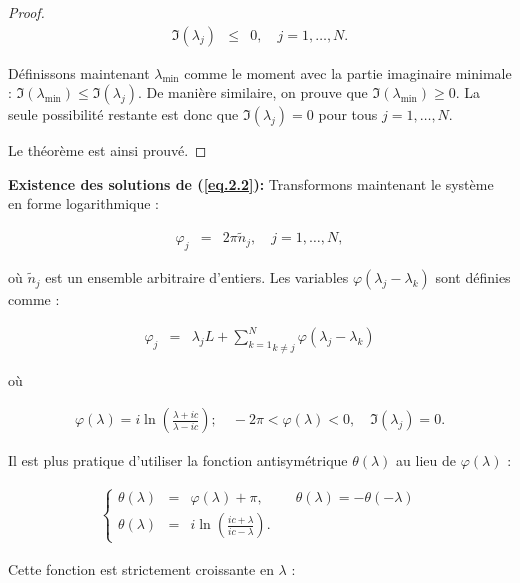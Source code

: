 \begin{proof}
	\begin{eqnarray}
		\Im(\lambda_j)  & \leq &  0, \quad j = 1, \dots, N.	
	\end{eqnarray}

	
	Définissons maintenant \( \lambda_{\text{min}} \) comme le moment avec la partie imaginaire minimale : \( \Im(\lambda_{\text{min}}) \leq \Im(\lambda_j) \). De manière similaire, on prouve que \( \Im(\lambda_{\text{min}}) \geq 0 \). La seule possibilité restante est donc que \( \Im(\lambda_j) = 0 \) pour tous \( j = 1, \dots, N \).
	
	Le théorème est ainsi prouvé.
	
\end{proof}


\textbf{Existence des solutions de (\ref{eq.2.2}):}
Transformons maintenant le système en forme logarithmique :


\begin{eqnarray}
	\varphi_j & = &	2 \pi \tilde{n}_j 	, \quad j = 1, \dots, N, \label{eq.2.8}
\end{eqnarray}


où \( \tilde{n}_j \) est un ensemble arbitraire d'entiers. Les variables \( \varphi(\lambda_j - \lambda_k) \) sont définies comme :

\begin{eqnarray}
	\varphi_j & = & \lambda_j L + \underset{k \neq j}{\sum_{k = 1}^N } \varphi(\lambda_j - \lambda_k)	\label{eq.2.9}
\end{eqnarray}

où

\begin{eqnarray}
	\varphi(\lambda) = i \ln \left( \frac{\lambda + ic}{\lambda - ic} \right); \quad - 2 \pi < \varphi(\lambda ) < 0 , \quad \Im(\lambda_j) = 0.		
\end{eqnarray}


Il est plus pratique d'utiliser la fonction antisymétrique \( \theta(\lambda) \) au lieu de \( \varphi(\lambda) \) :

\begin{eqnarray}
	\left \{ \begin{array}{rclr} \theta(\lambda)  &=& \varphi(\lambda) + \pi , & \quad \theta(\lambda)   =   -\theta(-\lambda) \\ \theta(\lambda) &  = &  \displaystyle  i  \ln\left( \frac{i c + \lambda }{ic - \lambda } \right). \end{array} \right. 	
\end{eqnarray}

Cette fonction est strictement croissante en \( \lambda \) : 

